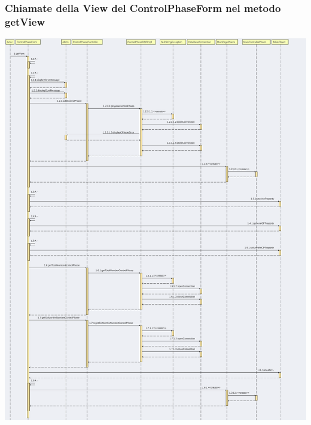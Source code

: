 \documentclass[11pt]{article}
\begin{document}
        \subsubsection*{Chiamate della View del ControlPhaseForm nel metodo getView}
        \begin{center}
            \includegraphics[width=1\textwidth]{pictures/prova.png}
        \end{center}

    \newpage
\end{document}
